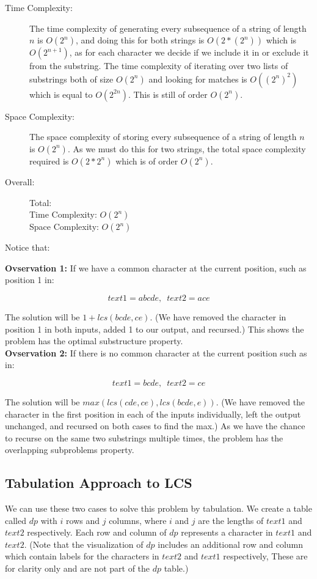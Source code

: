 \begin{description}
    \item[Time Complexity:]
        The time complexity of generating every subsequence of a string of length $n$ is $O(2^n)$,
        and doing this for both strings is $O(2 * (2^n))$ which is $O(2^{n+1})$,
        as for each character we decide if we include it in or exclude it from the substring.
        The time complexity of iterating over two lists of substrings both of size $O(2^n)$ and looking for matches is $O((2^n)^2)$ which is equal to $O(2^{2n})$.
        This is still of order $O(2^n)$.

        
    \item[Space Complexity:]
        The space complexity of storing every subsequence of a string of length $n$ is $O(2^n)$.
        As we must do this for two strings, the total space complexity required is $O(2 * 2^n)$ which is of order $O(2^n)$.

    \item[Overall:] Total:\\
        Time Complexity: $O(2^n)$\\
        Space Complexity: $O(2^n)$
    
\end{description}

Notice that:

\textbf{Ovservation 1:} If we have a common character at the current position, such as position 1 in:

$$text1=abcde,\phantom{0} text2=ace$$

The solution will be $1 + lcs(bcde,ce)$. (We have removed the character in position 1 in both inputs, added 1 to our output, and recursed.)
This shows the problem has the optimal substructure property.\\

\textbf{Ovservation 2:} If there is no common character at the current position such as in:

$$text1=bcde,\phantom{0} text2=ce$$

The solution will be $max(lcs(cde,ce), lcs(bcde,e))$. (We have removed the character in the first position in each of the inputs individually, left the output unchanged, and recursed on both cases to find the max.)
As we have the chance to recurse on the same two substrings multiple times, the problem has the overlapping subproblems property.
\subsection{Tabulation Approach to LCS}
We can use these two cases to solve this problem by tabulation.
We create a table called $dp$ with $i$ rows and $j$ columns, where $i$ and $j$ are the lengths of $text1$ and $text2$ respectively.
Each row and column of $dp$ represents a character in $text1$ and $text2$. (Note that the visualization of $dp$ includes an additional row and column which contain labels for the characters in $text2$ and $text1$ respectively, These are for clarity only and are not part of the $dp$ table.)

